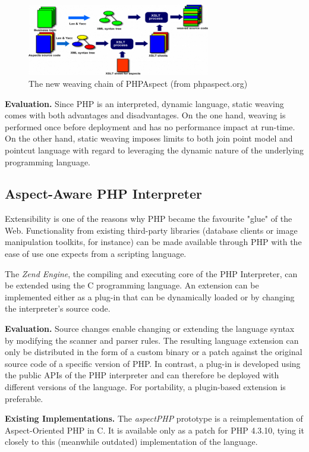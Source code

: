 \documentclass{acm_proc_article-sp}
\begin{document}
\begin{figure}[h!]
\centering
\includegraphics[width=8cm]{phpaspect_weaving2}
\caption{The new weaving chain of PHPAspect  (from phpaspect.org)}
\label{PHPAspect2}
\end{figure}

\textbf{Evaluation.} Since PHP is an interpreted, dynamic
language, static weaving comes with both advantages and
disadvantages. On the one hand, weaving is performed once before
deployment and has no performance impact at run-time. On the other
hand, static weaving imposes limits to both join point model and
pointcut language with regard to leveraging the dynamic nature of
the underlying programming language.

\subsection{Aspect-Aware PHP Interpreter}
Extensibility is one of the reasons why PHP became the favourite
"glue" of the Web. Functionality from existing third-party
libraries (database clients or image manipulation toolkits, for
instance) can be made available through PHP with the ease of use
one expects from a scripting language.

The \emph{Zend Engine}, the compiling and executing core of the
PHP Interpreter, can be extended using the C programming language.
An extension can be implemented either as a plug-in that can be
dynamically loaded or by changing the interpreter's source code.

\textbf{Evaluation.} %
Source changes enable changing or extending the language syntax by
modifying the scanner and parser rules. The resulting language
extension can only be distributed in the form of a custom binary
or a patch against the original source code of a specific version
of PHP. In contrast, a plug-in is developed using the public APIs
of the PHP interpreter and can therefore be deployed with
different versions of the language. For portability, a
plugin-based extension is preferable.

\textbf{Existing Implementations.} %
The \emph{aspectPHP} prototype \cite{aspectPHP} is a
reimplementation of Aspect-Oriented PHP \cite{AOPHP} in C. It is
available only as a patch for PHP 4.3.10, tying it closely to this
(meanwhile outdated) implementation of the language.
\end{document}
